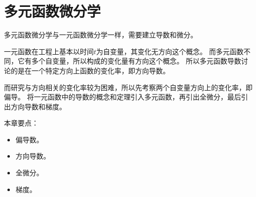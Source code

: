 \chapter{多元函数微分学}

多元函数微分学与一元函数微分学一样，需要建立导数和微分。

一元函数在工程上基本以时间$t$为自变量，其变化无方向这个概念。
而多元函数不同，它有多个自变量，所以构成的变化量有方向这个概念。
所以多元函数导数讨论的是在一个特定方向上函数的变化率，即方向导数。

而研究与方向相关的变化率较为困难，所以先考察两个自变量方向上的变化率，即偏导。
将一元函数中的导数的概念和定理引入多元函数，再引出全微分，最后引出方向导数和梯度。

本章要点：
\begin{itemize}
    \item 偏导数。
    \item 方向导数。
    \item 全微分。
    \item 梯度。
\end{itemize}

~

\newpage


\newpage


\newpage


\newpage


\newpage


\newpage


\newpage


\newpage


\newpage


\newpage


\newpage


\newpage


\newpage





